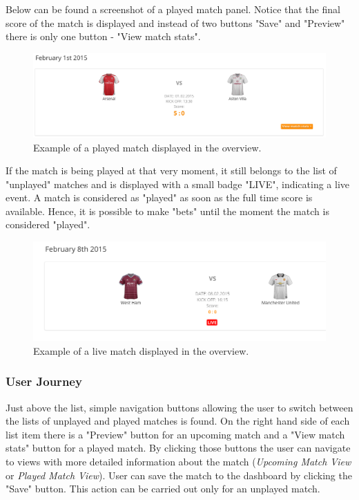 Below can be found a screenshot of a played match panel. Notice that the final score of the match is displayed and instead of two buttons "Save" and "Preview" there is only one button - "View match stats".

\begin{figure}[H]
	\begin{center}
		\includegraphics[width=.90\textwidth]{impl/images/playedMatch}
		\caption{Example of a played match displayed in the overview.} \label{fig:using:playedmatch}
	\end{center}
\end{figure}

If the match is being played at that very moment, it still belongs to the list of "unplayed" matches and is displayed with a small badge "LIVE", indicating a live event. A match is considered as "played" as soon as the full time score is available. Hence, it is possible to make "bets" until the moment the match is considered "played".

\begin{figure}[H]
	\begin{center}
		\includegraphics[width=.90\textwidth]{impl/images/liveMatch}
		\caption{Example of a live match displayed in the overview.} \label{fig:using:livematch}
	\end{center}
\end{figure}

\subsubsection*{User Journey}
\label{subsec:matchesoviewuserjourney}
Just above the list, simple navigation buttons allowing the user to switch between the lists of unplayed and played matches is found. On the right hand side of each list item there is a "Preview" button for an upcoming match and a "View match stats" button for a played match. By clicking those buttons the user can navigate to views with more detailed information about the match (\emph{Upcoming Match View} or \emph{Played Match View}). User can save the match to the dashboard by clicking the "Save" button. This action can be carried out only for an unplayed match. 

